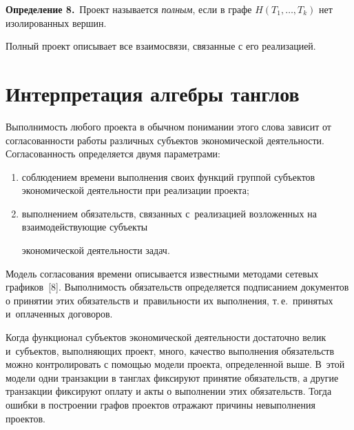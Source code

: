   \textbf{Определение 8.}\ Проект называется \textit{полным}, если в графе $H(T_1,\ldots, T_k)$ нет изолированных вершин. 


  


  \smallskip


  


  Полный проект описывает все взаимосвязи, связанные с его реализацией. 


  


  \section{Интерпретация алгебры танглов}


  


  Выполнимость любого проекта в обычном понимании этого слова зависит от согласованности работы различных субъектов экономической деятельности. Согласованность определяется двумя параметрами:


  \begin{enumerate}[(1)]


\item соблюдением времени выполнения своих функций группой субъектов экономической деятельности при реализации проекта;


\item выполнением обязательств, связанных с~реализацией возложенных на взаимодействующие субъекты


 экономической деятельности задач. 


  \end{enumerate}


  


  Модель согласования времени описывается известными методами сетевых графиков~[8]. Выполнимость обязательств определяется подписанием документов о принятии этих обязательств и~правильности их выполнения, т.\,е.\ принятых и~оплаченных договоров. 


  


  Когда функционал субъектов экономической деятельности достаточно велик и~субъектов, выполняющих проект, много, качество выполнения обязательств можно контролировать с помощью модели проекта, определенной выше. В~этой модели одни транзакции в танглах фиксируют принятие обязательств, а другие транзакции фиксируют оплату и акты о выполнении этих обязательств. Тогда ошибки в построении графов проектов отражают причины невыполнения проектов.


